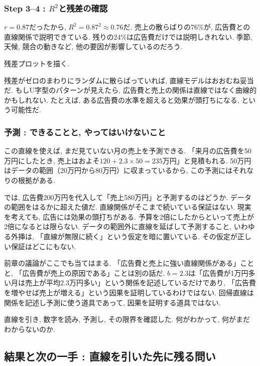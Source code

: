 \subsubsection*{Step 3--4 : $R^2$と残差の確認}

$r = 0.87$だったから, $R^2 = 0.87^2 \approx 0.76$だ.
売上の散らばりの76\%が, 広告費との直線関係で説明できている.
残りの24\%は広告費だけでは説明しきれない.
季節, 天候, 競合の動きなど, 他の要因が影響しているのだろう.

残差プロットを描く.


残差がゼロのまわりにランダムに散らばっていれば, 直線モデルはおおむね妥当だ.
もしU字型のパターンが見えたら, 広告費と売上の関係は直線ではなく曲線的かもしれない.
たとえば, ある広告費の水準を超えると効果が頭打ちになる, という可能性だ.

\subsubsection*{予測 : できることと, やってはいけないこと}

この直線を使えば, まだ見ていない月の売上を予測できる.
「来月の広告費を50万円にしたとき, 売上はおよそ$120 + 2.3 \times 50 = 235$万円」と見積もれる.
50万円はデータの範囲（20万円から80万円）に収まっているから, この予測にはそれなりの根拠がある.

では, 広告費200万円を代入して「売上580万円」と予測するのはどうか.
データの範囲をはるかに超えた値だ.
直線関係がそこまで続いている保証はない.
現実を考えても, 広告には効果の頭打ちがある.
予算を2倍にしたからといって売上が2倍になるとは限らない.
データの範囲外に直線を延ばして予測すること, いわゆる外挿は, 「直線が無限に続く」という仮定を暗に置いている.
その仮定が正しい保証はどこにもない.

前章の議論がここでも当てはまる.
「広告費と売上に強い直線関係がある」ことと, 「広告費が売上の原因である」ことは別の話だ.
$b = 2.3$は「広告費が1万円多い月は売上が平均2.3万円多い」という関係を記述しているだけであり, 「広告費を増やせば売上が増える」という因果を証明しているわけではない.
回帰直線は関係を記述し予測に使う道具であって, 因果を証明する道具ではない.

直線を引き, 数字を読み, 予測し, その限界を確認した.
何がわかって, 何がまだわからないのか.


\subsection{結果と次の一手 : 直線を引いた先に残る問い}

